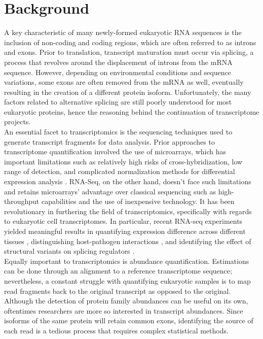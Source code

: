 \section{Background}
A key characteristic of many newly-formed eukaryotic RNA sequences is the inclusion of non-coding and coding regions, which are often referred to as introns and exons. 
Prior to translation, transcript maturation must occur via splicing, 
a process that revolves around the displacement of introns from the mRNA sequence. 
However, depending on environmental conditions and sequence variations, 
some exons are often removed from the mRNA as well, eventually resulting in 
the creation of a different protein isoform. 
Unfortunately, the many factors related to alternative splicing are still poorly understood 
for most eukaryotic proteins, hence the reasoning behind the continuation of transcriptome projects.
\\
An essential facet to transcriptomics is the sequencing techniques used to generate transcript 
fragments for data analysis. Prior approaches to transcriptome quantification involved the use 
of microarrays, which has important limitations such as relatively high risks of cross-hybridization, 
low range of detection, and complicated normalization methods for differential expression analysis 
\cite{Wang_Gerstein_Snyder_2009}. 
RNA-Seq, on the other hand, doesn’t face such limitations and retains microarrays’ 
advantage over classical sequencing such as high-throughput capabilities and the use of inexpensive technology. 
It has been revolutionary in furthering the field of transcriptomics, specifically with regards to eukaryotic cell transcriptomes. 
In particular, recent RNA-seq experiments yielded meaningful results in quantifying expression 
difference across different tissues \cite{Glinos_et_al._2022}, distinguishing host-pathogen interactions 
\cite{Pisu_Huang_Grenier_Russell_2020}, and identifying the effect of structural variants on splicing regulators 
\cite{Pascal_et_al._2023}. 
\\	
Equally important to transcriptomics is abundance quantification. 
Estimations can be done through an alignment to a reference transcriptome sequence; nevertheless, a constant struggle with quantifying eukaryotic samples is to map read fragments back to the original transcript as opposed to the original. Although the detection of protein family abundances can be useful on its own, oftentimes researchers are more so interested in transcript abundances. Since isoforms of the same protein will retain common exons, identifying the source of each read is a tedious process that requires complex statistical methods.
